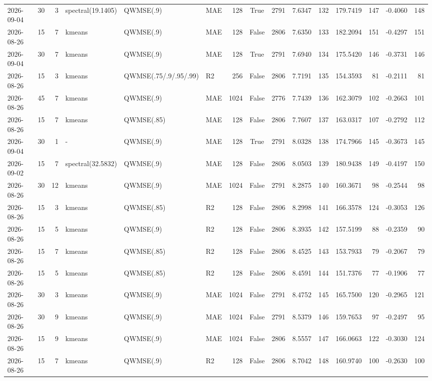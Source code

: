 \documentclass[10pt]{article}
\begin{document}
\begin{landscape}
\begin{longtable}{@{}lrrlllrcrrrrrrr@{}}
2026-09-04 & 30 & 3 & spectral(19.1405) & QWMSE(.9) & MAE & 128 & True & 2791 & 7.6347 & 132 & 179.7419 & 147 & -0.4060 & 148 \\
2026-08-26 & 15 & 7 & kmeans & QWMSE(.9) & MAE & 128 & False & 2806 & 7.6350 & 133 & 182.2094 & 151 & -0.4297 & 151 \\
2026-09-04 & 30 & 7 & kmeans & QWMSE(.9) & MAE & 128 & True & 2791 & 7.6940 & 134 & 175.5420 & 146 & -0.3731 & 146 \\
2026-08-26 & 15 & 3 & kmeans & QWMSE(.75/.9/.95/.99) & R2 & 256 & False & 2806 & 7.7191 & 135 & 154.3593 & 81 & -0.2111 & 81 \\
2026-08-26 & 45 & 7 & kmeans & QWMSE(.9) & MAE & 1024 & False & 2776 & 7.7439 & 136 & 162.3079 & 102 & -0.2663 & 101 \\
2026-08-26 & 15 & 7 & kmeans & QWMSE(.85) & MAE & 128 & False & 2806 & 7.7607 & 137 & 163.0317 & 107 & -0.2792 & 112 \\
2026-09-04 & 30 & 1 & - & QWMSE(.9) & MAE & 128 & True & 2791 & 8.0328 & 138 & 174.7966 & 145 & -0.3673 & 145 \\
2026-09-02 & 15 & 7 & spectral(32.5832) & QWMSE(.9) & MAE & 128 & False & 2806 & 8.0503 & 139 & 180.9438 & 149 & -0.4197 & 150 \\
2026-08-26 & 30 & 12 & kmeans & QWMSE(.9) & MAE & 1024 & False & 2791 & 8.2875 & 140 & 160.3671 & 98 & -0.2544 & 98 \\
2026-08-26 & 15 & 3 & kmeans & QWMSE(.85) & R2 & 128 & False & 2806 & 8.2998 & 141 & 166.3578 & 124 & -0.3053 & 126 \\
2026-08-26 & 15 & 5 & kmeans & QWMSE(.9) & R2 & 128 & False & 2806 & 8.3935 & 142 & 157.5199 & 88 & -0.2359 & 90 \\
2026-08-26 & 15 & 7 & kmeans & QWMSE(.85) & R2 & 128 & False & 2806 & 8.4525 & 143 & 153.7933 & 79 & -0.2067 & 79 \\
2026-08-26 & 15 & 5 & kmeans & QWMSE(.85) & R2 & 128 & False & 2806 & 8.4591 & 144 & 151.7376 & 77 & -0.1906 & 77 \\
2026-08-26 & 30 & 3 & kmeans & QWMSE(.9) & MAE & 1024 & False & 2791 & 8.4752 & 145 & 165.7500 & 120 & -0.2965 & 121 \\
2026-08-26 & 30 & 9 & kmeans & QWMSE(.9) & MAE & 1024 & False & 2791 & 8.5379 & 146 & 159.7653 & 97 & -0.2497 & 95 \\
2026-08-26 & 15 & 9 & kmeans & QWMSE(.9) & MAE & 1024 & False & 2806 & 8.5557 & 147 & 166.0663 & 122 & -0.3030 & 124 \\
2026-08-26 & 15 & 7 & kmeans & QWMSE(.9) & R2 & 128 & False & 2806 & 8.7042 & 148 & 160.9740 & 100 & -0.2630 & 100 \\

\end{longtable}
\end{landscape}
\end{document}
